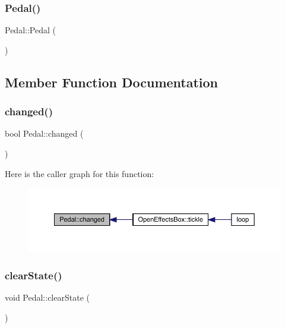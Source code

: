 \subsubsection{\texorpdfstring{Pedal()}{Pedal()}}
{\footnotesize\ttfamily Pedal\+::\+Pedal (\begin{DoxyParamCaption}{ }\end{DoxyParamCaption})}



\subsection{Member Function Documentation}
\mbox{\label{class_pedal_ac80c8219516f356b764f998d6a135d13}} 
\subsubsection{\texorpdfstring{changed()}{changed()}}
{\footnotesize\ttfamily bool Pedal\+::changed (\begin{DoxyParamCaption}{ }\end{DoxyParamCaption})}

Here is the caller graph for this function\+:\nopagebreak
\begin{figure}[H]
\begin{center}
\leavevmode
\includegraphics[width=350pt]{class_pedal_ac80c8219516f356b764f998d6a135d13_icgraph}
\end{center}
\end{figure}
\mbox{\label{class_pedal_a2d8c1db9ddf3d92b354d0f9937802bc6}} 
\subsubsection{\texorpdfstring{clear\+State()}{clearState()}}
{\footnotesize\ttfamily void Pedal\+::clear\+State (\begin{DoxyParamCaption}{ }\end{DoxyParamCaption})}

